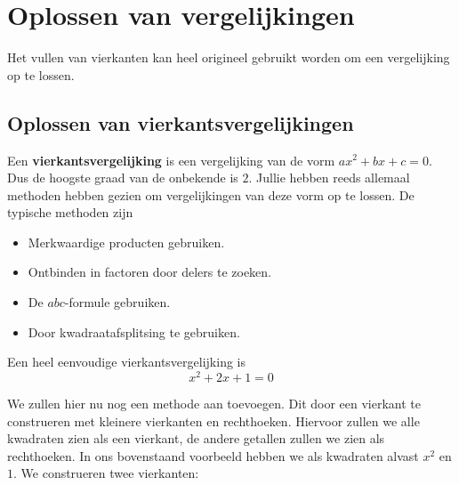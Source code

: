 
\section{Oplossen van vergelijkingen}

Het vullen van vierkanten kan heel origineel gebruikt worden om een vergelijking op te lossen. 

\subsection{Oplossen van vierkantsvergelijkingen}

Een {\bf vierkantsvergelijking} is een vergelijking van de vorm $ax^2 + bx + c = 0$. Dus de hoogste graad van de onbekende is $2$. Jullie hebben reeds allemaal methoden hebben gezien om vergelijkingen van deze vorm op te lossen. De typische methoden zijn
\begin{itemize}
  \item Merkwaardige producten gebruiken.
  \item Ontbinden in factoren door delers te zoeken.
  \item De $abc$-formule gebruiken.
  \item Door kwadraatafsplitsing te gebruiken.
\end{itemize}


\answer[1cm]{}

Een heel eenvoudige vierkantsvergelijking is
$$
x^2+2x+1=0
$$



We zullen hier nu nog een methode aan toevoegen. Dit door een vierkant te construeren met kleinere vierkanten en rechthoeken. Hiervoor zullen we alle kwadraten zien als een vierkant, de andere getallen zullen we zien als rechthoeken. In ons bovenstaand voorbeeld hebben we als kwadraten alvast $x^2$ en $1$. We construeren twee vierkanten:

\begin{center}

\end{center}

